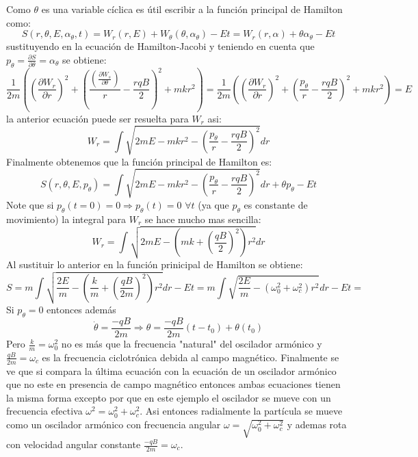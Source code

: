 \documentclass[letterpaper,10pt]{article}
\begin{document}
Como $\theta$ es una variable c\'iclica es \'util escribir a la funci\'on principal de Hamilton como:
$$
S(r,\theta,E,\alpha_\theta,t)=W_r(r,E)+W_\theta(\theta, \alpha_\theta)-E t =W_r(r,\alpha)+\theta \alpha_\theta-E t $$
sustituyendo en la ecuaci\'on de Hamilton-Jacobi y teniendo en cuenta que $p_\theta=\frac{\partial S}{\partial \theta}=\alpha_\theta$ se obtiene:
$$
\frac{1}{2m}\left(\left( \frac{\partial W_r}{\partial r }\right)^2+\left(\frac{\left( \frac{\partial W_s}{\partial \theta}\right)}{r}-\frac{r q B}{2} \right)^2 + m k r^2\right)=\frac{1}{2m}\left(\left( \frac{\partial W_r}{\partial r }\right)^2+\left(\frac{p_\theta}{r}-\frac{r q B}{2} \right)^2 + m k r^2\right)=E
$$
la anterior ecuaci\'on puede ser resuelta para $W_r$ asi:
$$
W_r=\int \sqrt{2 m E-m k r^2-\left(\frac{p_\theta}{r}-\frac{r q B}{2}  \right)^2}dr$$
Finalmente obtenemos que la funci\'on principal de Hamilton es:
$$
S(r,\theta,E,p_\theta)=\int \sqrt{2 m E-m k r^2-\left(\frac{p_\theta}{r}-\frac{r q B}{2}  \right)^2}dr+\theta p_\theta-E t
$$
Note que si $p_\theta(t=0)=0\Rightarrow p_\theta(t)=0$  $\forall t$ (ya que $p_\theta$ es constante de movimiento) la integral para $W_r$ se hace mucho mas sencilla:
$$
W_r=\int \sqrt{2 m E-\left(m k +\left(\frac{q B}{2}\right)^2\right)r^2}dr$$
Al sustituir lo anterior en la funci\'on prinicipal de Hamilton se obtiene:
$$S= m\int \sqrt{\frac{2 E}{m}-\left(\frac{k}{m} +\left(\frac{q B}{2m}\right)^2\right)r^2}dr-E t=m\int \sqrt{\frac{2 E}{m}-\left(\omega_0^2 +\omega_c^2\right)r^2}dr-E t=$$
Si $p_\theta=0$ entonces adem\'as 
$$\dot \theta=\frac{-q B}{2 m}\Rightarrow \theta=\frac{-q B}{2 m} (t-t_0)+\theta(t_0)$$
Pero $\frac{k}{m}=\omega_0^2$ no es m\'as que la frecuencia "natural" del oscilador arm\'onico y $\frac{q B}{2m}= \omega_c$  es la frecuencia ciclotr\'onica debida al campo magn\'etico. Finalmente se ve que si compara la \'ultima ecuaci\'on con la ecuaci\'on de un oscilador arm\'onico que no este en presencia de campo magn\'etico entonces ambas ecuaciones tienen la misma forma excepto por que en este ejemplo el oscilador se mueve con un frecuencia efectiva $\omega^2=\omega_0^2+\omega_c^2$. Asi entonces radialmente la part\'icula se mueve como un oscilador arm\'onico con frecuencia angular $\omega=\sqrt{\omega_0^2+\omega_c^2}$ y ademas rota con velocidad angular constante $\frac{-q B}{2 m}=\omega_c$.
\end{document}
